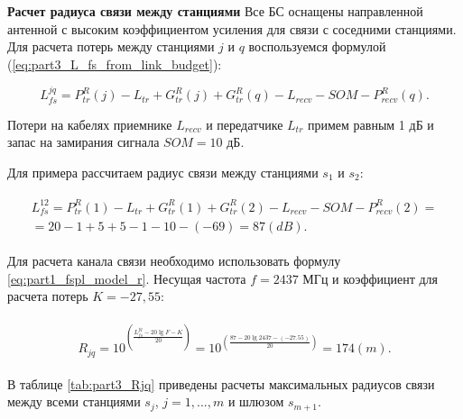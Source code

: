 \textbf{Расчет радиуса связи между станциями}
Все БС оснащены направленной антенной с высоким коэффициентом усиления для связи с соседними станциями.
Для расчета потерь между станциями $j$ и $q$ воспользуемся формулой (\ref{eq:part3_L_fs_from_link_budget}):

\begin{displaymath}
  L_{fs}^{jq} = P_{tr}^R(j) - L_{tr} + G_{tr}^R(j) + G_{tr}^R(q) - L_{recv} - SOM - P_{recv}^R(q).
\end{displaymath}


Потери на кабелях приемнике $ L_{recv} $ и передатчике $ L_{tr} $ примем равным 1 дБ и запас на замирания сигнала $ SOM = 10 $ дБ.

Для примера рассчитаем радиус связи между станциями $ s_1 $ и $ s_2 $:

\begin{align}
  \begin{aligned}
  L_{fs}^{12} = P_{tr}^R(1) - L_{tr} + G_{tr}^R(1) + G_{tr}^R(2) - L_{recv} - SOM - P_{recv}^R(2)= \\
  = 20 - 1 + 5 + 5 - 1 - 10 - (-69) = 87 (dB).
  \end{aligned}
\end{align}

Для расчета канала связи необходимо использовать формулу \cref{eq:part1_fspl_model_r}. Несущая частота $ f = 2437 $ МГц и коэффициент для расчета потерь $ K = -27,55 $:


\begin{align}
  \begin{aligned}
  R_{jq} = 10^{\left(\frac{L_{fs}^{jq} - 20\lg{F} - K}{20}\right)}
  = 10^{\left(\frac{87 - 20\lg{2437} - (-27.55)}{20}\right)} = 174 (m).
  \end{aligned}
\end{align}

В таблице \cref{tab:part3_Rjq} приведены расчеты максимальных радиусов связи между всеми станциями $ s_j $, $ j = 1, ..., m $ и шлюзом $ s_ {m + 1} $.

